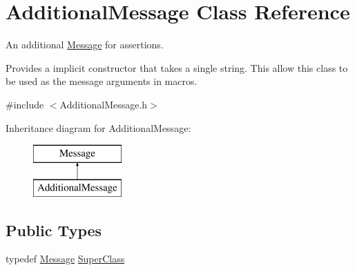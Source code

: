 \hypertarget{class_additional_message}{\section{Additional\-Message Class Reference}
\label{class_additional_message}
}


An additional \hyperlink{class_message}{Message} for assertions.

Provides a implicit constructor that takes a single string. This allow this class to be used as the message arguments in macros.  




{\ttfamily \#include $<$Additional\-Message.\-h$>$}

Inheritance diagram for Additional\-Message\-:\begin{figure}[H]
\begin{center}
\leavevmode
\includegraphics[height=2.000000cm]{class_additional_message}
\end{center}
\end{figure}
\subsection*{Public Types}
\begin{DoxyCompactItemize}
\item 
typedef \hyperlink{class_message}{Message} \hyperlink{class_additional_message_abc8626e28c147b5ddd66032a35676126}{Super\-Class}
\end{DoxyCompactItemize}
